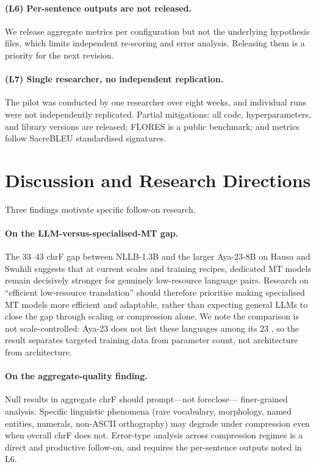 \documentclass[11pt,a4paper]{article}
\begin{document}
\paragraph{(L6) Per-sentence outputs are not released.}
We release aggregate metrics per configuration but not the underlying
hypothesis files, which limits independent re-scoring and error
analysis. Releasing them is a priority for the next revision.

\paragraph{(L7) Single researcher, no independent replication.}
The pilot was conducted by one researcher over eight weeks, and
individual runs were not independently replicated. Partial mitigations:
all code, hyperparameters, and library versions are released; FLORES is
a public benchmark; and metrics follow SacreBLEU standardised
signatures.

\section{Discussion and Research Directions}

Three findings motivate specific follow-on research.

\paragraph{On the LLM-versus-specialised-MT gap.}
The 33--43 chrF gap between NLLB-1.3B and the larger Aya-23-8B on
Hausa and Swahili suggests that at current scales and training recipes,
dedicated MT models remain decisively stronger for genuinely
low-resource language pairs. Research on ``efficient low-resource
translation'' should therefore prioritise making specialised MT models
more efficient and adaptable, rather than expecting general LLMs to
close the gap through scaling or compression alone. We note the
comparison is not scale-controlled: Aya-23 does not list these
languages among its 23 \cite{aryabumi2024aya23}, so the result
separates targeted training data from parameter count, not architecture
from architecture.

\paragraph{On the aggregate-quality finding.}
Null results in aggregate chrF should prompt---not foreclose---
finer-grained analysis. Specific linguistic phenomena (rare vocabulary,
morphology, named entities, numerals, non-ASCII orthography) may
degrade under compression even when overall chrF does not. Error-type
analysis across compression regimes is a direct and productive
follow-on, and requires the per-sentence outputs noted in L6.
\end{document}
